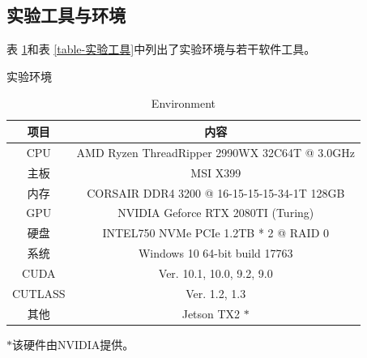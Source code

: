 \subsection{实验工具与环境}
\par 表 \ref{table-环境}和表 \ref{table-实验工具}中列出了实验环境与若干软件工具。\\
\begin{table}[H]
	\centering
	\renewcommand{\thetable}{\arabic{section}-\arabic{table} }
	\renewcommand{\tablename}{表}
	\caption{实验环境}
	\addtocounter{table}{-1}
	\renewcommand{\thetable}{\arabic{section}-\arabic{table} }
	\renewcommand{\tablename}{Table}
	\caption{Environment}
	\begin{tabular}{cc}
		\toprule
		项目	&	内容\\
		\midrule
		CPU		&	AMD Ryzen ThreadRipper 2990WX 32C64T @ 3.0GHz\\
		主板		&	MSI X399\\
		内存		&	CORSAIR DDR4 3200 @ 16-15-15-15-34-1T 128GB\\
		GPU		&	NVIDIA Geforce RTX 2080TI (Turing)\\
		硬盘		&	INTEL750 NVMe PCIe 1.2TB * 2 @ RAID 0\\
		系统		&	Windows 10 64-bit build 17763\\	
		CUDA	&	Ver. 10.1, 10.0, 9.2, 9.0\\
		CUTLASS & Ver. 1.2, 1.3\\
		其他		&	Jetson TX2 $ * $\\
		\bottomrule
	\end{tabular} 
	\label{table-环境}
	
	$ * $该硬件由NVIDIA提供。\\
\end{table}

